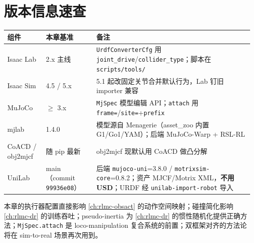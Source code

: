 \section*{版本信息速查}
\label{sec:rlmc-assets-versions}

\begin{center}
\small
\begin{tabularx}{\linewidth}{@{}llL@{}}
\toprule
组件 & 本章基准 & 备注 \\
\midrule
Isaac Lab & 2.x 主线 & \texttt{UrdfConverterCfg} 用 \texttt{joint\_drive}/\allowbreak\texttt{collider\_type}；脚本在 \texttt{scripts/\allowbreak tools/\allowbreak } \\
Isaac Sim & 4.5 / 5.x & 5.1 起改固定关节合并默认行为，Lab 钉旧 importer 兼容 \\
MuJoCo & $\ge$ 3.x & \texttt{MjSpec} 模型编辑 API；\texttt{attach} 用 \texttt{frame=}/\allowbreak\texttt{site=}+\texttt{prefix} \\
mjlab & 1.4.0 & 模型源自 Menagerie（asset\_zoo 内置 G1/Go1/YAM）；后端 MuJoCo-Warp + RSL-RL \\
CoACD / obj2mjcf & 随 pip 最新 & obj2mjcf 现默认用 CoACD 做凸分解 \\
UniLab & main（commit \texttt{99936e08}） & 后端 \texttt{mujoco-uni}=3.8.0 / \texttt{motrixsim-core}=0.8.2；资产 MJCF/Motrix XML，\textbf{不用 USD}；URDF 经 \texttt{unilab-import-robot} 导入 \\
\bottomrule
\end{tabularx}
\end{center}

\begin{note}[本章与后续的连接]
本章的执行器配置直接影响 \cref{ch:rlmc-obsact} 的动作空间映射；碰撞简化影响 \cref{ch:rlmc-dr} 的训练吞吐；pseudo-inertia 为 \cref{ch:rlmc-dr} 的惯性随机化提供正确方法；\texttt{MjSpec.\allowbreak attach} 是 loco-manipulation 复合系统的前置；双框架对齐的方法论将在 sim-to-real 场景再次用到。
\end{note}

